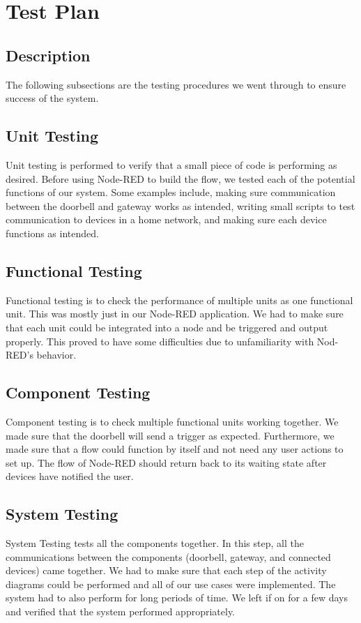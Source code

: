 \chapter{Test Plan}

\section{Description}
The following subsections are the testing procedures we went through to ensure success of the system.

\section{Unit Testing}
Unit testing is performed to verify that a small piece of code is performing as desired. Before using Node-RED to build the flow, we tested each of the potential functions of our system. Some examples include, making sure communication between the doorbell and gateway works as intended, writing small scripts to test communication to devices in a home network, and making sure each device functions as intended.

\section{Functional Testing}
Functional testing is to check the performance of multiple units as one functional unit. This was mostly just in our Node-RED application. We had to make sure that each unit could be integrated into a node and be triggered and output properly. This proved to have some difficulties due to unfamiliarity with Nod-RED's behavior.

\section{Component Testing}
Component testing is to check multiple functional units working together. We made sure that the doorbell will send a trigger as expected. Furthermore, we made sure that a flow could function by itself and not need any user actions to set up. The flow of Node-RED should return back to its waiting state after devices have notified the user.

\section{System Testing}
System Testing tests all the components together. In this step, all the communications between the components (doorbell, gateway, and connected devices) came together. We had to make sure that each step of the activity diagrams could be performed and all of our use cases were implemented. The system had to also perform for long periods of time. We left if on for a few days and verified that the system performed appropriately.